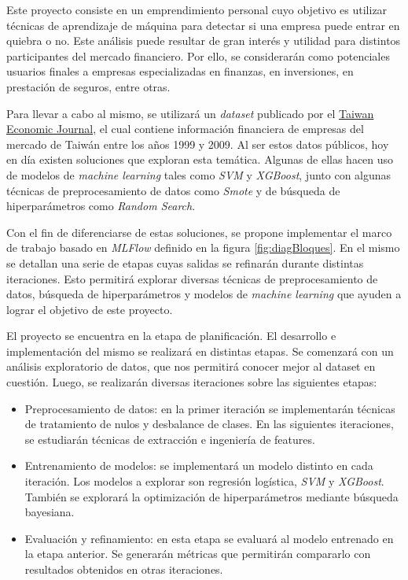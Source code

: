 \documentclass[
11pt, %
]{charter}
\begin{document}
Este proyecto consiste en un emprendimiento personal cuyo objetivo es utilizar técnicas de aprendizaje de máquina para detectar si una empresa puede entrar en quiebra o no. Este análisis puede resultar de gran interés y utilidad para distintos participantes del mercado financiero. Por ello, se considerarán como potenciales usuarios finales a empresas especializadas en finanzas, en inversiones, en prestación de seguros, entre otras.

Para llevar a cabo al mismo, se utilizará un \textit{dataset} publicado por el \href{https://www.tejwin.com/en/}{Taiwan Economic Journal}, el cual contiene información financiera de empresas del mercado de Taiwán entre los años 1999 y 2009. Al ser estos datos públicos, hoy en día existen soluciones que exploran esta temática. Algunas de ellas hacen uso de modelos de \textit{machine learning} tales como \textit{SVM} y \textit{XGBoost}, junto con algunas técnicas de preprocesamiento de datos como \textit{Smote} y de búsqueda de hiperparámetros como \textit{Random Search}.

Con el fin de diferenciarse de estas soluciones, se propone implementar el marco de trabajo basado en \textit{MLFlow} definido en la figura \ref{fig:diagBloques}. En el mismo se detallan una serie de etapas cuyas salidas se refinarán durante distintas iteraciones. Esto permitirá explorar diversas técnicas de preprocesamiento de datos, búsqueda de hiperparámetros y modelos de \textit{machine learning} que ayuden a lograr el objetivo de este proyecto.

El proyecto se encuentra en la etapa de planificación. El desarrollo e implementación del mismo se realizará en distintas etapas. Se comenzará con un análisis exploratorio de datos, que nos permitirá conocer mejor al dataset en cuestión. Luego, se realizarán diversas iteraciones sobre las siguientes etapas:

\begin{itemize}
	\item Preprocesamiento de datos: en la primer iteración se implementarán técnicas de tratamiento de nulos y desbalance de clases. En las siguientes iteraciones, se estudiarán técnicas de extracción e ingeniería de features.
	\item Entrenamiento de modelos: se implementará un modelo distinto en cada iteración. Los modelos a explorar son regresión logística, \textit{SVM} y \textit{XGBoost}. También se explorará la optimización de hiperparámetros mediante búsqueda bayesiana.
	\item Evaluación y refinamiento: en esta etapa se evaluará al modelo entrenado en la etapa anterior. Se generarán métricas que permitirán compararlo con resultados obtenidos en otras iteraciones.
\end{itemize}
\end{document}
